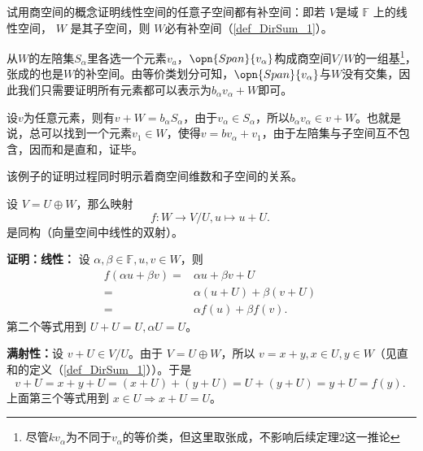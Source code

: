 \begin{example}{}%
试用商空间的概念证明线性空间的任意子空间都有补空间：即若 $V$是域 $\mathbb F$ 上的线性空间， $W$ 是其子空间，则 $W$必有补空间（\autoref{def_DirSum_1}）。

从$W$的左陪集${S_{\alpha}}$里各选一个元素$v_a$，$\opn{Span} \{v_{\alpha}\}$构成商空间$V/W$的一组基\footnote{尽管$kv_\alpha$为不同于$v_\alpha$的等价类，但这里取张成，不影响后续定理2这一推论}，张成的也是$W$的补空间。由等价类划分可知，$\opn{Span} \{v_{\alpha}\}$与$W$没有交集，因此我们只需要证明所有元素都可以表示为$b_{\alpha}v_{\alpha} + W$即可。

设$v$为任意元素，则有$v + W=b_{\alpha} S_{\alpha}$，由于$v_{\alpha} \in S_{\alpha}$，所以$b_{\alpha} v_{\alpha} \in v + W$。也就是说，总可以找到一个元素$v_1 \in W$，使得$v=bv_{\alpha} + v_1$，由于左陪集与子空间互不包含，因而和是直和，证毕。

该例子的证明过程同时明示着商空间维数和子空间的关系。
\end{example}



\begin{theorem}{}\label{the_QuoSpa_3}
设 $V=U\oplus W$，那么映射 
\begin{equation}
f:W\rightarrow V/U, u\mapsto u+U.~  
\end{equation}
是同构（向量空间中线性的双射）。
\end{theorem}

\textbf{证明：}\textbf{线性：} 设 $\alpha,\beta\in\mathbb F,u,v\in W$，则
\begin{equation}
\begin{aligned}
f(\alpha u+\beta v)=&\alpha u+\beta v+U\\
=&\alpha (u+U)+\beta(v+U)\\
=&\alpha f(u)+\beta f(v).
\end{aligned}~
\end{equation}
第二个等式用到 $U+U=U,\alpha U=U$。 

\textbf{满射性：}设 $v+U\in V/U$。由于 $V=U\oplus W$，所以 $v=x+y,x\in U,y\in W$（见直和的定义（\autoref{def_DirSum_1}））。于是
\begin{equation}
v+U=x+y+U=(x+U)+(y+U)=U+(y+U)=y+U=f(y).~
\end{equation}
上面第三个等式用到 $x\in U\Rightarrow x+U=U$。

